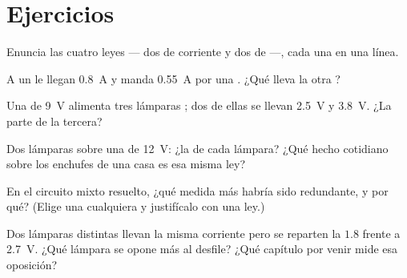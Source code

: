 \section{Ejercicios}

\begin{exercise}[$\star$]\label{exo:g8:circuit-laws:1}
Enuncia las cuatro leyes --- dos de corriente y dos de
 ---, cada una en una línea.
\end{exercise}

\begin{exercise}[$\star$]\label{exo:g8:circuit-laws:2}
A un  le llegan \qty{0.8}{A} y manda \qty{0.55}{A} por una
. ¿Qué lleva la otra ?
\end{exercise}

\begin{exercise}[$\star$]\label{exo:g8:circuit-laws:3}
Una  de \qty{9}{V} alimenta tres lámparas ; dos de
ellas se llevan \qty{2.5}{V} y \qty{3.8}{V}. ¿La parte de la tercera?
\end{exercise}

\begin{exercise}[$\star$]\label{exo:g8:circuit-laws:4}
Dos lámparas  sobre una  de
\qty{12}{V}: ¿la  de cada lámpara? ¿Qué hecho cotidiano
sobre los enchufes de una casa es esa misma ley?
\end{exercise}

\begin{exercise}[$\star$]\label{exo:g8:circuit-laws:5}
En el circuito mixto resuelto, ¿qué medida más habría sido redundante,
y por qué? (Elige una cualquiera y justifícalo con una ley.)
\end{exercise}

\begin{exercise}[$\star$]\label{exo:g8:circuit-laws:6}
Dos lámparas distintas  llevan la misma corriente pero se
reparten la  $1.8$ frente a \qty{2.7}{V}. ¿Qué lámpara se
opone más al desfile? ¿Qué capítulo por venir mide esa
oposición?
\end{exercise}

